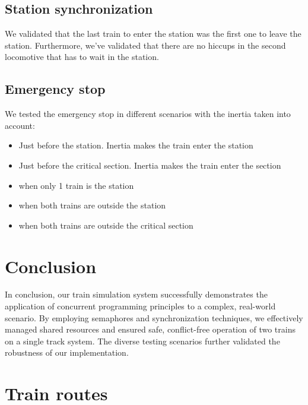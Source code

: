 \documentclass{article}
\begin{document}
    \subsection*{Station synchronization}
        We validated that the last train to enter the station was the first one to leave the station. Furthermore, we've validated that there are no hiccups in the second locomotive that has to wait in the station.
    \subsection*{Emergency stop}

    We tested the emergency stop in different scenarios with the inertia taken into account:
    \begin{itemize}
        \item Just before the station. Inertia makes the train enter the station
        \item Just before the critical section. Inertia makes the train enter the section
        \item when only 1 train is the station
        \item when both trains are outside the station
        \item when both trains are outside the critical section
    \end{itemize}

    \section{Conclusion}

    In conclusion, our train simulation system successfully demonstrates the application of concurrent programming principles to a complex, real-world scenario. By employing semaphores and synchronization techniques, we effectively managed shared resources and ensured safe, conflict-free operation of two trains on a single track system. The diverse testing scenarios further validated the robustness of our implementation.

    \appendix

    \pagebreak

    \section{Train routes}
\end{document}
